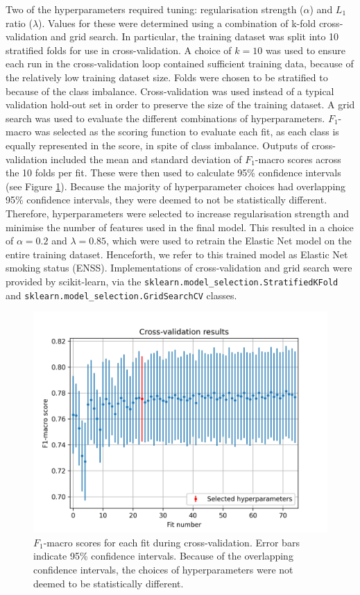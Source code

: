 \documentclass{article} %
\begin{document}
Two of the hyperparameters required tuning: regularisation strength (\(\alpha\)) and \(L_1\) ratio (\(\lambda\)). Values for these were determined using a combination of k-fold cross-validation and grid search. In particular, the training dataset was split into 10 stratified folds for use in cross-validation. A choice of \(k=10\) was used to ensure each run in the cross-validation loop contained sufficient training data, because of the relatively low training dataset size. Folds were chosen to be stratified to because of the class imbalance. Cross-validation was used instead of a typical validation hold-out set in order to preserve the size of the training dataset. A grid search was used to evaluate the different combinations of hyperparameters. \(F_1\)-macro was selected as the scoring function to evaluate each fit, as each class is equally represented in the score, in spite of class imbalance. Outputs of cross-validation included the mean and standard deviation of \(F_1\)-macro scores across the 10 folds per fit. These were then used to calculate 95\% confidence intervals (see Figure \ref{fig:cross-validation}). Because the majority of hyperparameter choices had overlapping 95\% confidence intervals, they were deemed to not be statistically different. Therefore, hyperparameters were selected to increase regularisation strength and minimise the number of features used in the final model. This resulted in a choice of \(\alpha = 0.2\) and \(\lambda = 0.85\), which were used to retrain the Elastic Net model on the entire training dataset. Henceforth, we refer to this trained model as Elastic Net smoking status (ENSS). Implementations of cross-validation and grid search were provided by scikit-learn, via the \verb|sklearn.model_selection.StratifiedKFold| and \verb|sklearn.model_selection.GridSearchCV| classes.

\begin{figure}[tb]
    \centering
    \includegraphics[width=0.8\linewidth]{cross_validation.png}
    \caption[Cross-validation scores per fit]{\(F_1\)-macro scores for each fit during cross-validation. Error bars indicate 95\% confidence intervals. Because of the overlapping confidence intervals, the choices of hyperparameters were not deemed to be statistically different.}
    \label{fig:cross-validation}
\end{figure}
\end{document}
